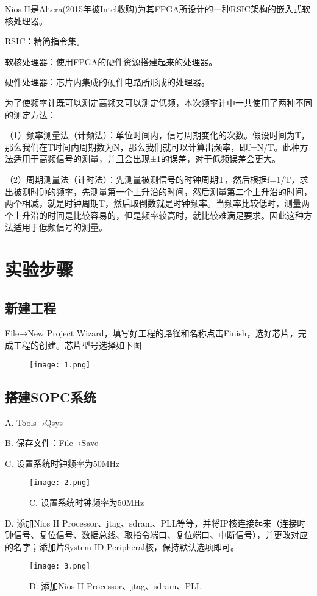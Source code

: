 \documentclass[AutoFakeBold]{LZUThesis}
\begin{document}
Nios II是Altera(2015年被Intel收购)为其FPGA所设计的一种RSIC架构的嵌入式软核处理器。

RSIC：精简指令集。

软核处理器：使用FPGA的硬件资源搭建起来的处理器。

硬件处理器：芯片内集成的硬件电路所形成的处理器。

为了使频率计既可以测定高频又可以测定低频，本次频率计中一共使用了两种不同的测定方法：

（1）频率测量法（计频法）：单位时间内，信号周期变化的次数。假设时间为T，那么我们在T时间内周期数为N，那么我们就可以计算出频率，即f=N/T。此种方法适用于高频信号的测量，并且会出现±1的误差，对于低频误差会更大。

（2）周期测量法（计时法）：先测量被测信号的时钟周期T，然后根据f=1/T，求出被测时钟的频率，先测量第一个上升沿的时间，然后测量第二个上升沿的时间，两个相减，就是时钟周期T，然后取倒数就是时钟频率。当频率比较低时，测量两个上升沿的时间是比较容易的，但是频率较高时，就比较难满足要求。因此这种方法适用于低频信号的测量。

\chapter{实验步骤}
\section{新建工程}
File→New Project Wizard，填写好工程的路径和名称点击Finish，选好芯片，完成工程的创建。芯片型号选择如下图
\begin{figure}[htbp]
    \centering
    \texttt{[image: 1.png]}
\end{figure}
\section{搭建SOPC系统}
A. Tools→Qsys

B. 保存文件：File→Save

C. 设置系统时钟频率为50MHz

\begin{figure}[htbp]
    \centering
    \texttt{[image: 2.png]}
    \caption{C. 设置系统时钟频率为50MHz}
\end{figure}

D. 添加Nios II Processor、jtag、sdram、PLL等等，并将IP核连接起来（连接时钟信号、复位信号、数据总线、取指令端口、复位端口、中断信号），并更改对应的名字；添加片System ID Peripheral核，保持默认选项即可。

\begin{figure}[htbp]
    \centering
    \texttt{[image: 3.png]}
    \caption{D. 添加Nios II Processor、jtag、sdram、PLL}
\end{figure}
\end{document}
